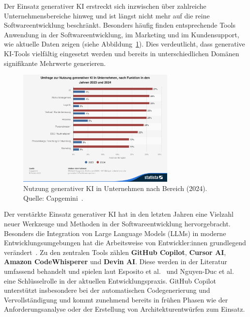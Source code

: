 
Der Einsatz generativer KI erstreckt sich inzwischen über zahlreiche
Unternehmensbereiche hinweg und ist längst nicht mehr auf die reine
Softwareentwicklung beschränkt. Besonders häufig finden entsprechende Tools
Anwendung in der Softwareentwicklung, im Marketing und im Kundensupport, wie
aktuelle Daten zeigen (siehe Abbildung~\ref{fig:ki-einsatzbereiche}). Dies
verdeutlicht, dass generative KI-Tools vielfältig eingesetzt werden und bereits
in unterschiedlichen Domänen signifikante Mehrwerte generieren.

\begin{figure}[H]
    \centering
    \vspace{1em}
    \includegraphics[width=0.7\textwidth]{images/abbildungen/statistic_id1483724_nutzung-generativer-ki-in-unternehmen-nach-bereich-2024.png}
    \caption{Nutzung generativer KI in Unternehmen nach Bereich (2024). Quelle: Capgemini~\cite{statista_ki_einsatzbereiche_2024}.}
    \label{fig:ki-einsatzbereiche}
\end{figure}

Der verstärkte Einsatz generativer KI hat in den letzten Jahren eine Vielzahl
neuer Werkzeuge und Methoden in der Softwareentwicklung hervorgebracht.
Besonders die Integration von Large Language Models (LLMs) in moderne
Entwicklungsumgebungen hat die Arbeitsweise von Entwickler:innen grundlegend
verändert~\cite{esposito_generative_2025,nguyen-duc_generative_2023}. Zu den
zentralen Tools zählen \textbf{GitHub Copilot}, \textbf{Cursor AI},
\textbf{Amazon CodeWhisperer} und \textbf{Devin AI}. Diese werden in der
Literatur umfassend behandelt und spielen laut Esposito et
al.~\cite{esposito_generative_2025} und Nguyen-Duc et
al.~\cite{nguyen-duc_generative_2023} eine Schlüsselrolle in der aktuellen
Entwicklungspraxis. GitHub Copilot unterstützt insbesondere bei der
automatischen Codegenerierung und Vervollständigung und kommt zunehmend bereits
in frühen Phasen wie der Anforderungsanalyse oder der Erstellung von
Architekturentwürfen zum Einsatz.

